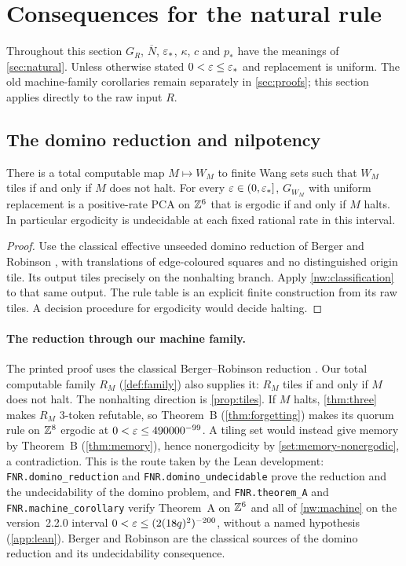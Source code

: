 \section{Consequences for the natural rule}\label{sec:natural-consequences}

Throughout this section $G_R$, $\overline N$, $\varepsilon_*$, $\kappa$, $c$ and $p_*$ have the meanings of \cref{sec:natural}. Unless otherwise stated $0<\varepsilon\le\varepsilon_*$ and replacement is uniform. The old machine-family corollaries remain separately in \cref{sec:proofs}; this section applies directly to the raw input $R$.

\subsection{The domino reduction and nilpotency}

\begin{corollary}[Theorem A on $\Z^6$]\label{nw:machine}
There is a total computable map $M\mapsto W_M$ to finite Wang sets such that $W_M$ tiles if and only if $M$ does not halt. For every $\varepsilon\in(0,\varepsilon_*]$, $G_{W_M}$ with uniform replacement is a positive-rate PCA on $\Z^6$ that is ergodic if and only if $M$ halts. In particular ergodicity is undecidable at each fixed rational rate in this interval.
\end{corollary}
\begin{proof}
Use the classical effective unseeded domino reduction of Berger and Robinson \cite{Berger66,Robinson71}, with translations of edge-coloured squares and no distinguished origin tile. Its output tiles precisely on the nonhalting branch. Apply \cref{nw:classification} to that same output. The rule table is an explicit finite construction from its raw tiles. A decision procedure for ergodicity would decide halting.
\end{proof}

\paragraph{The reduction through our machine family.}
The printed proof uses the classical Berger--Robinson reduction \cite{Berger66,Robinson71}. Our total computable family $R_M$ (\cref{def:family}) also supplies it: $R_M$ tiles if and only if $M$ does not halt. The nonhalting direction is \cref{prop:tiles}. If $M$ halts, \cref{thm:three} makes $R_M$ $3$-token refutable, so Theorem~B (\cref{thm:forgetting}) makes its quorum rule on $\mathbb{Z}^8$ ergodic at $0<\varepsilon\le490000^{-99}$. A tiling set would instead give memory by Theorem~B (\cref{thm:memory}), hence nonergodicity by \cref{set:memory-nonergodic}, a contradiction. This is the route taken by the Lean development: \nolinkurl{FNR.domino_reduction} and \nolinkurl{FNR.domino_undecidable} prove the reduction and the undecidability of the domino problem, and \nolinkurl{FNR.theorem_A} and \nolinkurl{FNR.machine_corollary} verify Theorem~A on $\Z^6$ and all of \cref{nw:machine} on the version~2.2.0 interval $0<\varepsilon\le(2(18q)^2)^{-200}$, without a named hypothesis (\cref{app:lean}). Berger and Robinson are the classical sources of the domino reduction and its undecidability consequence.

